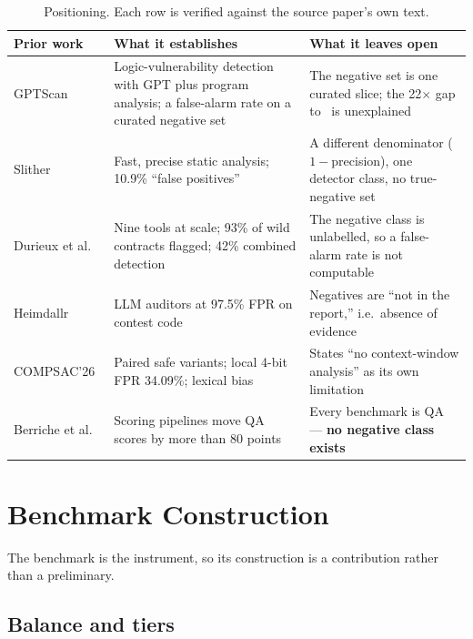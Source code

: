 \documentclass[sigconf,nonacm]{acmart}
\begin{document}
\begin{table}[t]
\centering
\caption{Positioning. Each row is verified against the source paper's own text.}
\label{tab:positioning}
\small
\begin{tabular}{@{}p{}p{}p{}@{}}
\toprule
\textbf{Prior work} & \textbf{What it establishes} & \textbf{What it leaves open} \\
\midrule
GPTScan~\cite{gptscan} &
Logic-vulnerability detection with GPT plus program analysis; a false-alarm rate
on a curated negative set &
The negative set is one curated slice; the 22$\times$ gap
to~\cite{heimdallr} is unexplained \\
Slither~\cite{slither} &
Fast, precise static analysis; 10.9\% ``false positives'' &
A different denominator ($1-$precision), one detector class, no true-negative
set \\
Durieux et al.~\cite{durieux} &
Nine tools at scale; 93\% of wild contracts flagged; 42\% combined detection &
The negative class is unlabelled, so a false-alarm rate is not computable \\
Heimdallr~\cite{heimdallr} &
LLM auditors at 97.5\% FPR on contest code &
Negatives are ``not in the report,'' i.e.\ absence of evidence \\
COMPSAC'26~\cite{compsac} &
Paired safe variants; local 4-bit FPR 34.09\%; lexical bias &
States ``no context-window analysis'' as its own limitation \\
Berriche et al.~\cite{berriche} &
Scoring pipelines move QA scores by more than 80 points &
Every benchmark is QA --- \textbf{no negative class exists} \\
\bottomrule
\end{tabular}
\end{table}

\section{Benchmark Construction}

The benchmark is the instrument, so its construction is a contribution rather
than a preliminary.

\subsection{Balance and tiers}
\end{document}

